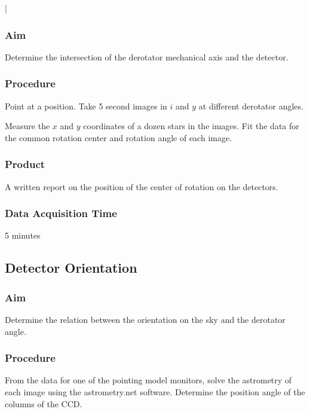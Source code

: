 |\documentclass{article}
\begin{document}
\subsubsection{Aim}

Determine the intersection of the derotator mechanical axis and the detector.

\subsubsection{Procedure}

Point at a position. Take 5 second images in $i$ and $y$ at different derotator angles.

Measure the $x$ and $y$ coordinates of a dozen stars in the images. Fit the data for the common rotation center and rotation angle of each image.

\subsubsection{Product}

A written report on the position of the center of rotation on the detectors.

\subsubsection{Data Acquisition Time}

5 minutes


\subsection{Detector Orientation}

\subsubsection{Aim}

Determine the relation between the orientation on the sky and the derotator angle.

\subsubsection{Procedure}

From the data for one of the pointing model monitors, solve the astrometry of each image using the astrometry.net software. Determine the position angle of the columns of the CCD.
\end{document}
